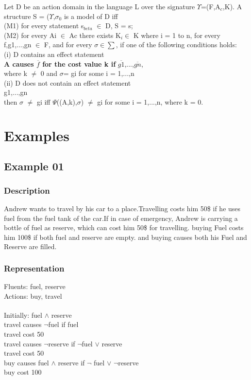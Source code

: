 \documentclass[11pt]{article}
\begin{document}
Let D be an action domain in the language L over the signature $\Upsilon$=(F,A$_{c}$,K). A structure S = ($\Upsilon$,$\sigma_{0}$ is a model of D iff\\
(M1) for every statement s$_{beta}$ $\in$ D, S \textbar= s;\\
(M2) for every Ai $\in$ Ac there exists K$_{i} \in$ K where i = 1 to n, for every f,g1,...,gn $\in$ F, and for every $\sigma\in\sum$, if one of the following conditions holds:
\\\indent
(i) D contains an effect statement\\
\indent\indent 
{\bfseries A causes $\overline{f}$ for the cost value k if} $\overline{g1}$,...,$\overline{gn}$,\\
\indent where k $\neq$ 0 and $\sigma$\textbar=  gi for some i = 1,...,n\\
\indent(ii) D does not contain an effect statement\\
\indent{} g1,...,gn\\
\indent then $\sigma$ \textbar$\neq$ gi iff $\Psi$((A,k),$\sigma$) \textbar$\neq$ gi for some i = 1,...,n, where k = 0.\\

	\section{Examples}\label{sec:Examples}
	\subsection{Example 01}\label{example:ex01}
	\subsubsection{Description}\label{par:p101}
	Andrew wants to travel by his car to a place.Travelling costs him 50\$ if he uses fuel from the fuel tank of the car.If in case of emergency, Andrew is carrying a bottle of fuel as reserve, which can cost him 50\$ for travelling. buying Fuel costs him 100\$ if both fuel and reserve are empty. and buying causes both his Fuel and Reserve are filled. 
	\subsubsection{Representation}\label{par:p201}
	Fluents: fuel, reserve\\
	Actions: buy, travel\\
	\\
	Initially:  fuel $\wedge$ reserve \\
	travel causes $\neg$fuel if fuel \\
	travel cost 50 \\
	travel causes $\neg$reserve if $\neg$fuel $\vee$ reserve\\
	travel cost 50 \\
	buy causes fuel $\wedge$ reserve  if $\neg$ fuel $\vee$ $\neg$reserve\\
	buy cost 100 \\
\end{document}
